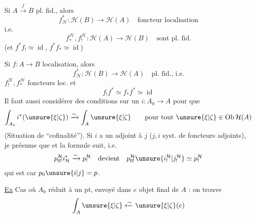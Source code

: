 Si $A\xrightarrow{f}B$ pl. fid., alors
\[
f_{\mathcal H}^*:\mathcal H(B)\longrightarrow\mathcal H(A)
\quad\text{foncteur localisation}
\]
i.e.
\[
f_*^{\mathcal H},f_!^{\mathcal H}:\mathcal H(A)\longrightarrow\mathcal H(B)
\quad\text{sont pl. fid.}
\]
(et $f^*f_!\simeq\operatorname{id}$, $f^*f_*\simeq\operatorname{id}$)

Si $f:A\longrightarrow B$ localisation, alors
\[
f_{\mathcal H}^*:\mathcal H(B)\longrightarrow\mathcal H(A)
\quad\text{pl. fid., i.e.}
\]
$f_!^{\mathcal H},f_*^{\mathcal H}$ foncteurs loc.  et
\[
f_!f^*\simeq f_*f^*\simeq\operatorname{id}
\]
Il faut aussi considérer des conditions sur un $i:A_0\longrightarrow A$ pour que
\[
\int_{A_0}i^*(\unsure{\xi|\zeta})\xrightarrow{\sim}\int_A\unsure{\xi|\zeta}
\qquad\text{pour tout }\unsure{\xi|\zeta}\in\operatorname{Ob}\mathcal H(A)
\]
(Situation de ``cofinalité''). Si $i$ a un adjoint à
 $j$
($j,i$ syst. de foncteurs adjoints), je présume que
et la formule suit, i.e.
\[
p_{0!}^{\mathcal H}i_{\mathcal H}^*\xrightarrow{\sim}p_!^{\mathcal H}
\quad\text{devient}\quad
p_{0!}^{\mathcal H}\unsure{i_!^{\mathcal H}|j_!^{\mathcal H}}\simeq p_!^{\mathcal H}
\]
qui est  car $p_0\unsure{i|j}=p$.

\uline{Ex} Cas où $A_0$ réduit à un pt, envoyé dans $e$ objet
final de $A$ : on trouve
\[
\int_A\unsure{\xi|\zeta}\xleftarrow{\sim}\unsure{\xi|\zeta}(e)
\]

